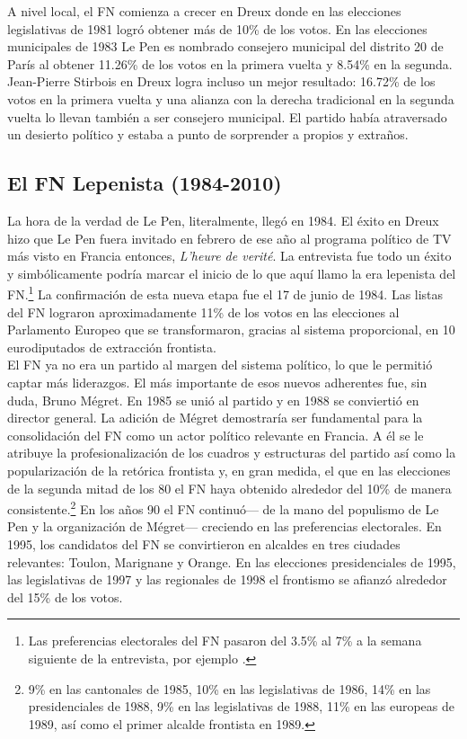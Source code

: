 A nivel local, el FN comienza a crecer en Dreux donde en las elecciones legislativas de 1981 logró obtener más de 10\% de los votos. En las elecciones municipales de 1983 Le Pen es nombrado consejero municipal del distrito 20 de París al obtener 11.26\% de los votos en la primera vuelta y 8.54\% en la segunda. Jean-Pierre Stirbois en Dreux logra incluso un mejor resultado: 16.72\% de los votos en la primera vuelta y una alianza con la derecha tradicional en la segunda vuelta lo llevan también a ser consejero municipal. El partido había atraversado un desierto político y estaba a punto de sorprender a propios y extraños.\\

\subsection{El FN Lepenista (1984-2010)}

La hora de la verdad de Le Pen, literalmente, llegó en 1984. El éxito en Dreux hizo que Le Pen fuera invitado en febrero de ese año al programa político de TV más visto en Francia entonces, \textit{L'heure de verité}. La entrevista fue todo un éxito y simbólicamente podría marcar el inicio de lo que aquí llamo la era lepenista del FN.\footnote{Las preferencias electorales del FN pasaron del 3.5\% al 7\% a la semana siguiente de la entrevista, por ejemplo \parencite[53]{Stockemer17}.} La confirmación de esta nueva etapa fue el 17 de junio de 1984. Las listas del FN lograron aproximadamente 11\% de los votos en las elecciones al Parlamento Europeo que se transformaron, gracias al sistema proporcional, en 10 eurodiputados de extracción frontista.\\ 

El FN ya no era un partido al margen del sistema político, lo que le permitió captar más liderazgos. El más importante de esos nuevos adherentes fue, sin duda, Bruno Mégret. En 1985 se unió al partido y en 1988 se conviertió en director general. La adición de Mégret demostraría ser fundamental para la consolidación del FN como un actor político relevante en Francia. A él se le atribuye la profesionalización de los cuadros y estructuras del partido así como la popularización de la retórica frontista y, en gran medida, el que en las elecciones de la segunda mitad de los 80 el FN haya obtenido alrededor del 10\% de manera consistente.\footnote{9\% en las cantonales de 1985, 10\% en las legislativas de 1986, 14\% en las presidenciales de 1988, 9\% en las legislativas de 1988, 11\% en las europeas de 1989, así como el primer alcalde frontista en 1989.} En los años 90 el FN continuó--- de la mano del populismo de Le Pen y la organización de Mégret--- creciendo en las preferencias electorales. En 1995, los candidatos del FN se convirtieron en alcaldes en tres ciudades relevantes: Toulon, Marignane y Orange. En las elecciones presidenciales de 1995, las legislativas de 1997 y las regionales de 1998 el frontismo se afianzó alrededor del 15\% de los votos.\\

